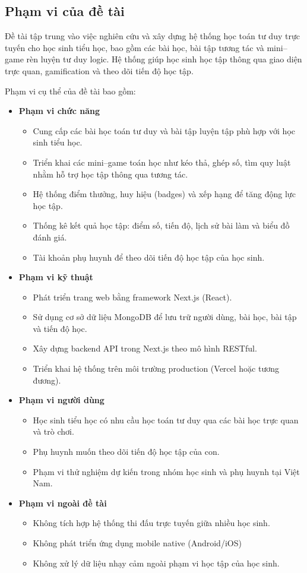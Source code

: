 \subsection{Phạm vi của đề tài}
Đề tài tập trung vào việc nghiên cứu và xây dựng hệ thống học toán tư duy trực tuyến cho học sinh tiểu học, bao gồm các bài học, bài tập tương tác và mini–game rèn luyện tư duy logic. Hệ thống giúp học sinh học tập thông qua giao diện trực quan, gamification và theo dõi tiến độ học tập.

Phạm vi cụ thể của đề tài bao gồm:

\begin{itemize}
  \item \textbf{Phạm vi chức năng}
  \begin{itemize}
    \item Cung cấp các bài học toán tư duy và bài tập luyện tập phù hợp với học sinh tiểu học.
    \item Triển khai các mini–game toán học như kéo thả, ghép số, tìm quy luật nhằm hỗ trợ học tập thông qua tương tác.
    \item Hệ thống điểm thưởng, huy hiệu (badges) và xếp hạng để tăng động lực học tập.
    \item Thống kê kết quả học tập: điểm số, tiến độ, lịch sử bài làm và biểu đồ đánh giá.
    \item Tài khoản phụ huynh để theo dõi tiến độ học tập của học sinh.
  \end{itemize}

  \item \textbf{Phạm vi kỹ thuật}
  \begin{itemize}
    \item Phát triển trang web bằng framework Next.js (React).
    \item Sử dụng cơ sở dữ liệu MongoDB để lưu trữ người dùng, bài học, bài tập và tiến độ học.
    \item Xây dựng backend API trong Next.js theo mô hình RESTful.
    \item Triển khai hệ thống trên môi trường production (Vercel hoặc tương đương).
  \end{itemize}

  \item \textbf{Phạm vi người dùng}
  \begin{itemize}
    \item Học sinh tiểu học có nhu cầu học toán tư duy qua các bài học trực quan và trò chơi.
    \item Phụ huynh muốn theo dõi tiến độ học tập của con.
    \item Phạm vi thử nghiệm dự kiến trong nhóm học sinh và phụ huynh tại Việt Nam.
  \end{itemize}

  \item \textbf{Phạm vi ngoài đề tài}
  \begin{itemize}
    \item Không tích hợp hệ thống thi đấu trực tuyến giữa nhiều học sinh.
    \item Không phát triển ứng dụng mobile native (Android/iOS)
    \item Không xử lý dữ liệu nhạy cảm ngoài phạm vi học tập của học sinh.
  \end{itemize}
\end{itemize}
